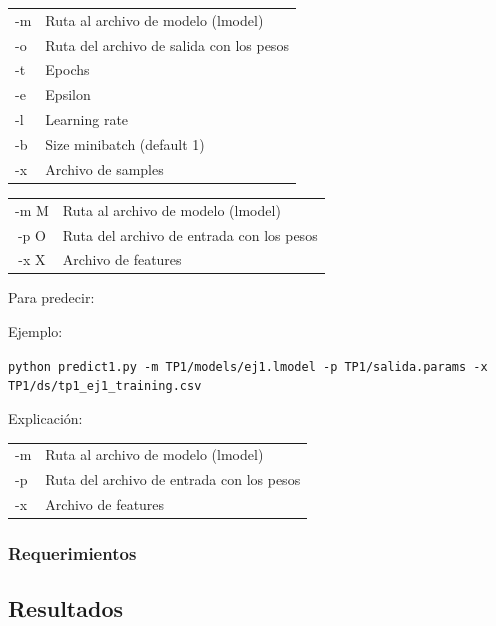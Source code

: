 \begin{tabular}{ l l }
-m & Ruta al archivo de modelo (lmodel) \\
-o & Ruta del archivo de salida con los pesos\\
-t & Epochs\\
-e & Epsilon\\
-l & Learning rate\\
-b & Size minibatch (default 1)\\
-x & Archivo de samples\\
\end{tabular}

\begin{tabular}{ c l }
-m M & Ruta al archivo de modelo (lmodel)\\
-p  O & Ruta del archivo de entrada con los pesos\\
-x  X & Archivo de features\\
\end{tabular}

Para predecir:

Ejemplo:

\noindent\texttt{\small{python predict1.py -m TP1/models/ej1.lmodel -p TP1/salida.params -x TP1/ds/tp1\_ej1\_training.csv}}

Explicación:

\begin{tabular}{ l l }
-m & Ruta al archivo de modelo (lmodel)\\
-p & Ruta del archivo de entrada con los pesos\\
-x & Archivo de features\\
\end{tabular}


\subsubsection{Requerimientos}


\subsection{Resultados}

